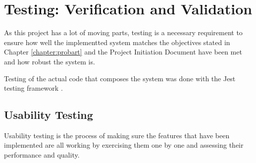 \chapter{Testing: Verification and Validation}


As this project has a lot of moving parts, testing is a necessary requirement to ensure how well the implementted system matches the objectives stated in Chapter \ref{chapter:probart} and the Project Initiation Document have been met and how robust the system is.

Testing of the actual code that composes the system was done with the Jest testing framework \cite{jest}.

\section{Usability Testing} \label{test:usability}

Usability testing is the process of making sure the features that have been implemented are all working by exercising them one by one and assessing their performance and quality.

